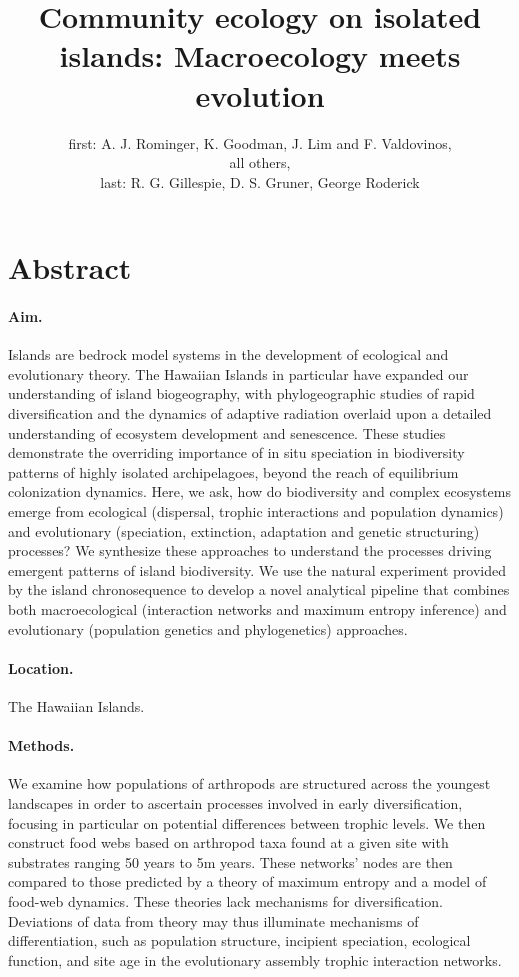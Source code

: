 \documentclass[12pt]{article}
\title{Community ecology on isolated islands: Macroecology meets
  evolution}
\author{
  first: A. J. Rominger, K. Goodman, J. Lim and F. Valdovinos, \\
  all others, \\
  last: R. G. Gillespie, D. S. Gruner, George Roderick
}
\date{}
\begin{document}
\baselineskip24pt
\maketitle 
\clearpage

\section*{Abstract}
\paragraph{Aim.}
Islands are bedrock model systems in the development of ecological and
evolutionary theory. The Hawaiian Islands in particular have expanded
our understanding of island biogeography, with phylogeographic studies
of rapid diversification and the dynamics of adaptive radiation
overlaid upon a detailed understanding of ecosystem development and
senescence. These studies demonstrate the overriding importance of in
situ speciation in biodiversity patterns of highly isolated
archipelagoes, beyond the reach of equilibrium colonization
dynamics. Here, we ask, how do biodiversity and complex ecosystems
emerge from ecological (dispersal, trophic interactions and population
dynamics) and evolutionary (speciation, extinction, adaptation and
genetic structuring) processes? We synthesize these approaches to
understand the processes driving emergent patterns of island
biodiversity. We use the natural experiment provided by the island
chronosequence to develop a novel analytical pipeline that combines
both macroecological (interaction networks and maximum entropy
inference) and evolutionary (population genetics and phylogenetics)
approaches.

\paragraph{Location.}
The Hawaiian Islands.

\paragraph{Methods.}
We examine how populations of arthropods are structured across the
youngest landscapes in order to ascertain processes involved in early
diversification, focusing in particular on potential differences
between trophic levels.  We then construct food webs based on
arthropod taxa found at a given site with substrates ranging 50 years
to 5m years.  These networks' nodes are then compared to those
predicted by a theory of maximum entropy and a model of food-web
dynamics.  These theories lack mechanisms for
diversification. Deviations of data from theory may thus illuminate
mechanisms of differentiation, such as population structure, incipient
speciation, ecological function, and site age in the evolutionary
assembly trophic interaction networks.
\end{document}
